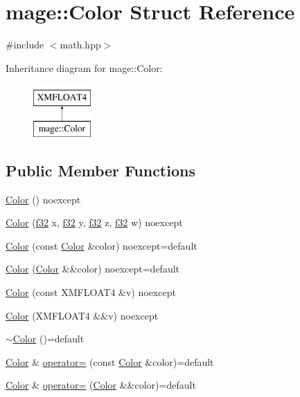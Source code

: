 \hypertarget{structmage_1_1_color}{}\section{mage\+:\+:Color Struct Reference}
\label{structmage_1_1_color}


{\ttfamily \#include $<$math.\+hpp$>$}

Inheritance diagram for mage\+:\+:Color\+:\begin{figure}[H]
\begin{center}
\leavevmode
\includegraphics[height=2.000000cm]{structmage_1_1_color}
\end{center}
\end{figure}
\subsection*{Public Member Functions}
\begin{DoxyCompactItemize}
\item 
\hyperlink{structmage_1_1_color_a542f26c61d9c67098302b0262c518758}{Color} () noexcept
\item 
\hyperlink{structmage_1_1_color_ad3cd2f679a74481281f8284169aa376e}{Color} (\hyperlink{namespacemage_a6a44ad388483959dc4dff9f2aef91431}{f32} x, \hyperlink{namespacemage_a6a44ad388483959dc4dff9f2aef91431}{f32} y, \hyperlink{namespacemage_a6a44ad388483959dc4dff9f2aef91431}{f32} z, \hyperlink{namespacemage_a6a44ad388483959dc4dff9f2aef91431}{f32} w) noexcept
\item 
\hyperlink{structmage_1_1_color_a89c7093e06f3554839a4016f287ef3d8}{Color} (const \hyperlink{structmage_1_1_color}{Color} \&color) noexcept=default
\item 
\hyperlink{structmage_1_1_color_ada141b94913980bf54a3ac4fb3d45f35}{Color} (\hyperlink{structmage_1_1_color}{Color} \&\&color) noexcept=default
\item 
\hyperlink{structmage_1_1_color_afb821e8ce617a6475538fa7179a16c6b}{Color} (const X\+M\+F\+L\+O\+A\+T4 \&v) noexcept
\item 
\hyperlink{structmage_1_1_color_a6e01540c01b2923974ca31e1621f1f7e}{Color} (X\+M\+F\+L\+O\+A\+T4 \&\&v) noexcept
\item 
\hyperlink{structmage_1_1_color_aa4df1c9718b7846adf77fbeed79ac219}{$\sim$\+Color} ()=default
\item 
\hyperlink{structmage_1_1_color}{Color} \& \hyperlink{structmage_1_1_color_a194847cf864911d7ceff16aabec1459f}{operator=} (const \hyperlink{structmage_1_1_color}{Color} \&color)=default
\item 
\hyperlink{structmage_1_1_color}{Color} \& \hyperlink{structmage_1_1_color_aa16160a9b8a03a8b2d82569343dd8c6d}{operator=} (\hyperlink{structmage_1_1_color}{Color} \&\&color)=default
\end{DoxyCompactItemize}


